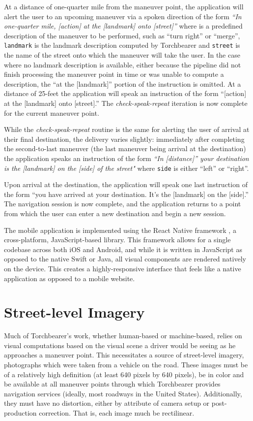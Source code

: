 At a distance of one-quarter mile from the maneuver point, the application will alert the user to an upcoming maneuver via a spoken direction of the form \textit{“In one-quarter mile, [action] at the [landmark] onto [street]”} where  is a predefined description of the maneuver to be performed, such as “turn right” or “merge”, \texttt{landmark} is the landmark description computed by Torchbearer and \texttt{street} is the name of the street onto which the maneuver will take the user. In the case where no landmark description is available, either because the pipeline did not finish processing the maneuver point in time or was unable to compute a description, the “at the [landmark]” portion of the instruction is omitted. At a distance of 25-feet the application will speak an instruction of the form “[action] at the [landmark] onto [street].” The \textit{check-speak-repeat} iteration is now complete for the current maneuver point.

While the \textit{check-speak-repeat} routine is the same for alerting the user of arrival at their final destination, the delivery varies slightly: immediately after completing the second-to-last maneuver (the last maneuver being arrival at the destination) the application speaks an instruction of the form \textit{“In [distance]” your destination is the [landmark] on the [side] of the street"} where \texttt{side} is either “left” or “right”.

Upon arrival at the destination, the application will speak one last instruction of the form “you have arrived at your destination. It’s the [landmark] on the [side].” The navigation session is now complete, and the application returns to a point from which the user can enter a new destination and begin a new session.

The mobile application is implemented using the React Native framework \cite{reactNative}, a cross-platform, JavaScript-based library. This framework allows for a single codebase across both iOS and  Android, and while it is written in JavaScript as opposed to the native Swift or Java, all visual components are rendered natively on the device. This creates a highly-responsive interface that feels like a native application as opposed to a mobile website. 

\section{Street-level Imagery}
Much of Torchbearer’s work, whether human-based or machine-based, relies on visual computations based on the visual scene a driver would be seeing as he approaches a maneuver point. This necessitates a source of street-level imagery, photographs which were taken from a vehicle on the road. These images must be of a relatively high definition (at least 640 pixels by 640 pixels), be in color and be available at all maneuver points through which Torchbearer provides navigation services (ideally, most roadways in the United States). Additionally, they must have no distortion, either by attribute of camera setup or post-production correction. That is, each image much be rectilinear.

